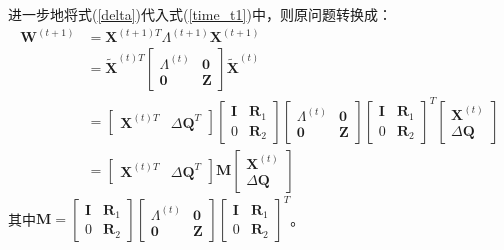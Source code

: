 进一步地将式(\ref{delta})代入式(\ref{time_t1})中，则原问题转换成：
\begin{equation}\label{time_t2}
	\begin{aligned}
	\textbf{W}^{(t+1)} &= \textbf{X}^{(t+1)T} \Lambda^{(t+1)} \textbf{X} ^{(t+1)} \\
	&= \tilde{\textbf{X}}^{(t)T} 
	\begin{bmatrix}  \Lambda^{(t)} & \textbf{0}\\
	\textbf{0} & \textbf{Z}
	\end{bmatrix}
	\tilde{\textbf{X}}^{(t)} \\
	&= \begin{bmatrix} \textbf{X}^{(t)T} & \Delta\textbf{Q}^{T} \end{bmatrix}\begin{bmatrix} \textbf{I} & \textbf{R}_1 \\
	0 & \textbf{R}_2 \end{bmatrix}
	\begin{bmatrix}  \Lambda^{(t)} & \textbf{0}\\
	\textbf{0} & \textbf{Z} \end{bmatrix}
	\begin{bmatrix} \textbf{I} & \textbf{R}_1 \\
	0 & \textbf{R}_2 \end{bmatrix} ^T
	\begin{bmatrix} \textbf{X}^{(t)} \\ \Delta\textbf{Q} \end{bmatrix} \\
	&= \begin{bmatrix} \textbf{X}^{(t)T} & \Delta\textbf{Q}^{T} \end{bmatrix}
	  \textbf{M} \begin{bmatrix} \textbf{X}^{(t)} \\ \Delta\textbf{Q} \end{bmatrix} 
	\end{aligned}
\end{equation}
其中$\textbf{M}=\begin{bmatrix} \textbf{I} & \textbf{R}_1 \\
0 & \textbf{R}_2 \end{bmatrix}
\begin{bmatrix}  \Lambda^{(t)} & \textbf{0}\\
\textbf{0} & \textbf{Z} \end{bmatrix}
\begin{bmatrix} \textbf{I} & \textbf{R}_1 \\
0 & \textbf{R}_2 \end{bmatrix} ^T$。

